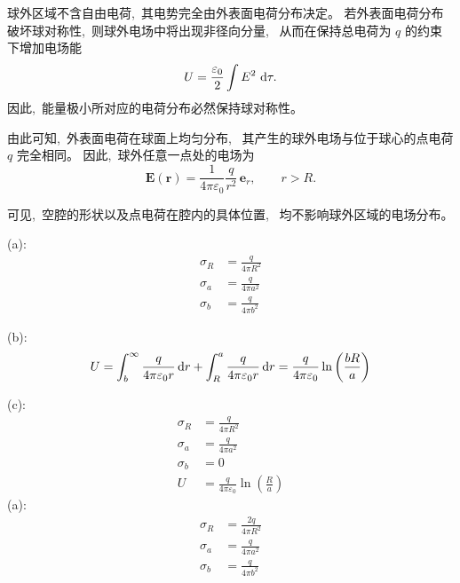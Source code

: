 \medskip

球外区域不含自由电荷, \,其电势完全由外表面电荷分布决定。
若外表面电荷分布破坏球对称性, \,则球外电场中将出现非径向分量, \,
从而在保持总电荷为 $q$ 的约束下增加电场能
\[
U=\frac{\varepsilon_0}{2}\int E^2\,\dif\tau.
\]
因此, \,能量极小所对应的电荷分布必然保持球对称性。

\medskip

由此可知, \,外表面电荷在球面上均匀分布, \,
其产生的球外电场与位于球心的点电荷 $q$ 完全相同。
因此, \,球外任意一点处的电场为
\[
\boldsymbol E(\boldsymbol r)
=
\frac{1}{4\pi\varepsilon_0}\frac{q}{r^2}\,{\boldsymbol e_r},
\qquad r>R.
\]

\medskip

可见, \,空腔的形状以及点电荷在腔内的具体位置, \,
均不影响球外区域的电场分布。


(a):
\begin{align*}
    \sigma_R&=\frac{q}{4\pi R^2}\\
    \sigma_a&=\frac{q}{4\pi a^2}\\
    \sigma_b&=\frac{q}{4\pi b^2}
\end{align*}

(b):
\begin{align*}
    U=\int_{b}^{\infty}\frac{q}{4\pi\varepsilon_0 r}\dif r
    +\int_{R}^{a}\frac{q}{4\pi\varepsilon_0 r}\dif r
    =\frac{q}{4\pi\varepsilon_0 }\ln \left(\frac{bR}{a}\right)
\end{align*}

(c):
\begin{align*}
    \sigma_R&=\frac{q}{4\pi R^2}\\
    \sigma_a&=\frac{q}{4\pi a^2}\\
    \sigma_b&=0\\
    U&=\frac{q}{4\pi\varepsilon_0 }\ln \left(\frac{R}{a}\right)
\end{align*}
(a):
\begin{align*}
    \sigma_R&=\frac{2q}{4\pi R^2}\\
    \sigma_a&=\frac{q}{4\pi a^2}\\
    \sigma_b&=\frac{q}{4\pi b^2}
\end{align*}

